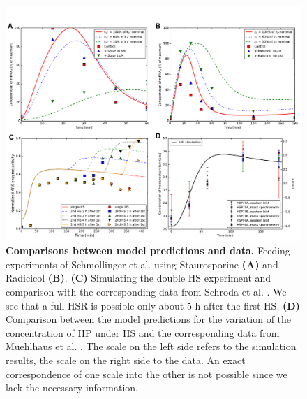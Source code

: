 \documentclass[oneside, 10pt, a4paper, twocolumn]{article}
\begin{document}
\begin{figure}
\centering
\includegraphics[width=\textwidth]{Figure3_Paper.pdf}
\caption{\small{\textbf{Comparisons between model predictions and data.} Feeding experiments of Schmollinger et al. \cite{Schmollinger2013} using Staurosporine \textbf{(A)} and Radicicol \textbf{(B)}. \textbf{(C)} Simulating the double HS experiment and comparison with the corresponding data from Schroda et al. \cite{Schroda2000}. We see that a full HSR is possible only about $5$ h after the first HS. \textbf{(D)} Comparison between the model predictions for the variation of the concentration of HP under HS and the corresponding data from Muehlhaus et al. \cite{Muehlhaus2011}. The scale on the left side refers to the simulation results, the scale on the right side to the data. An exact correspondence of one scale into the other is not possible since we lack the necessary information.}
}
\label{Figure3label}
\end{figure}

\clearpage
\end{document}
